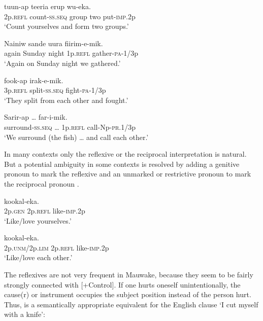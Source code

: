\ea%
\label{ex:3:x611}
\gll {} tuun-ap teeria erup wu-eka. \\
2p.\textsc{refl} count-\textsc{ss}.\textsc{seq} group two put-\textsc{imp}.2p\\
\glt`Count yourselves and form two groups.'
\z

\ea%
\label{ex:3:x1865}
\gll Nainiw sande uura  fiirim-e-mik. \\
again Sunday night 1p.\textsc{refl} gather-\textsc{pa}-1/3p\\
\glt`Again on Sunday night we gathered.'
\z

\ea%
\label{ex:3:x612}
\gll {} fook-ap irak-e-mik. \\
3p.\textsc{refl} split-\textsc{ss}.\textsc{seq} fight-\textsc{pa}-1/3p\\
\glt`They split from each other and fought.'
\z

\ea%
\label{ex:3:x1866}
\gll Sarir-ap {\dots }  far-i-mik. \\
surround-\textsc{ss}.\textsc{seq} {\dots} 1p.\textsc{refl} call-Np-\textsc{pr}.1/3p\\
\glt`We surround (the fish) {\dots} and call each other.'
\z

In many contexts only the reflexive or the reciprocal interpretation is natural. But a potential ambiguity in some contexts is resolved by adding a genitive pronoun to mark the reflexive  and an unmarked or restrictive pronoun to mark the reciprocal pronoun .

\ea%
\label{ex:3:x614}
\gll {}  kookal-eka. \\
2p.\textsc{gen} 2p.\textsc{refl} like-\textsc{imp}.2p\\
\glt`Like/love yourselves.'
\z

\ea%
\label{ex:3:x613}
\gll {}  kookal-eka. \\
2p.\textsc{unm}/2p.\textsc{lim} 2p.\textsc{refl} like-\textsc{imp}.2p\\
\glt`Like/love each other.'
\z

The reflexives are not very frequent in Mauwake, because they seem to be fairly strongly connected with [+Control]. If one hurts oneself unintentionally, the cause(r) or instrument occupies the subject position instead of the person hurt. Thus,  is a semantically appropriate equivalent for the English clause `I cut myself with a knife':

